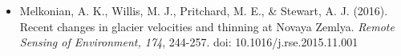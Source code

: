 
\begin{itemize}
    \item Melkonian, A. K., Willis, M. J., Pritchard, M. E., \& Stewart, A. J. (2016). Recent changes in glacier velocities and thinning at Novaya Zemlya. \textit{Remote Sensing of Environment, 174}, 244-257. doi: 10.1016/j.rse.2015.11.001
\end{itemize}
